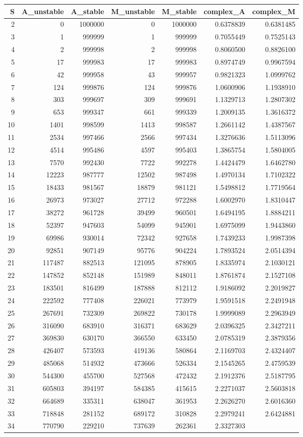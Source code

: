 \documentclass[]{article}
\begin{document}
\begin{longtable}[]{@{}rrrrrrr@{}}
\toprule
S & A\_unstable & A\_stable & M\_unstable & M\_stable & complex\_A &
complex\_M\tabularnewline
\midrule
\endhead
2 & 0 & 1000000 & 0 & 1000000 & 0.6378839 & 0.6381485\tabularnewline
3 & 1 & 999999 & 1 & 999999 & 0.7055449 & 0.7525143\tabularnewline
4 & 2 & 999998 & 2 & 999998 & 0.8060500 & 0.8826100\tabularnewline
5 & 17 & 999983 & 17 & 999983 & 0.8974749 & 0.9967594\tabularnewline
6 & 42 & 999958 & 43 & 999957 & 0.9821323 & 1.0999762\tabularnewline
7 & 124 & 999876 & 124 & 999876 & 1.0600906 & 1.1938910\tabularnewline
8 & 303 & 999697 & 309 & 999691 & 1.1329713 & 1.2807302\tabularnewline
9 & 653 & 999347 & 661 & 999339 & 1.2009135 & 1.3616372\tabularnewline
10 & 1401 & 998599 & 1413 & 998587 & 1.2661142 &
1.4387567\tabularnewline
11 & 2534 & 997466 & 2566 & 997434 & 1.3276636 &
1.5113096\tabularnewline
12 & 4514 & 995486 & 4597 & 995403 & 1.3865754 &
1.5804005\tabularnewline
13 & 7570 & 992430 & 7722 & 992278 & 1.4424479 &
1.6462780\tabularnewline
14 & 12223 & 987777 & 12502 & 987498 & 1.4970134 &
1.7102322\tabularnewline
15 & 18433 & 981567 & 18879 & 981121 & 1.5498812 &
1.7719564\tabularnewline
16 & 26973 & 973027 & 27712 & 972288 & 1.6002970 &
1.8310447\tabularnewline
17 & 38272 & 961728 & 39499 & 960501 & 1.6494195 &
1.8884211\tabularnewline
18 & 52397 & 947603 & 54099 & 945901 & 1.6975099 &
1.9443860\tabularnewline
19 & 69986 & 930014 & 72342 & 927658 & 1.7439233 &
1.9987398\tabularnewline
20 & 92851 & 907149 & 95776 & 904224 & 1.7893524 &
2.0514394\tabularnewline
21 & 117487 & 882513 & 121095 & 878905 & 1.8335974 &
2.1030121\tabularnewline
22 & 147852 & 852148 & 151989 & 848011 & 1.8761874 &
2.1527108\tabularnewline
23 & 183501 & 816499 & 187888 & 812112 & 1.9186092 &
2.2019827\tabularnewline
24 & 222592 & 777408 & 226021 & 773979 & 1.9591518 &
2.2491948\tabularnewline
25 & 267691 & 732309 & 269822 & 730178 & 1.9999089 &
2.2963949\tabularnewline
26 & 316090 & 683910 & 316371 & 683629 & 2.0396325 &
2.3427211\tabularnewline
27 & 369830 & 630170 & 366550 & 633450 & 2.0785319 &
2.3879356\tabularnewline
28 & 426407 & 573593 & 419136 & 580864 & 2.1169703 &
2.4324407\tabularnewline
29 & 485068 & 514932 & 473666 & 526334 & 2.1545265 &
2.4759539\tabularnewline
30 & 544300 & 455700 & 527568 & 472432 & 2.1912376 &
2.5187795\tabularnewline
31 & 605803 & 394197 & 584385 & 415615 & 2.2271037 &
2.5603818\tabularnewline
32 & 664689 & 335311 & 638047 & 361953 & 2.2626270 &
2.6016360\tabularnewline
33 & 718848 & 281152 & 689172 & 310828 & 2.2979241 &
2.6424881\tabularnewline
34 & 770790 & 229210 & 737639 & 262361 & 2.3327303 &

\end{longtable}
\end{document}
